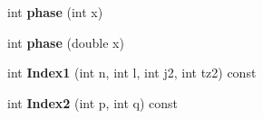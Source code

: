 \begin{DoxyCompactItemize}
\item 
\hypertarget{classModelSpace_a6b4d1686088e3fef492df10bbd806fe2}{int {\bfseries phase} (int x)}\label{classModelSpace_a6b4d1686088e3fef492df10bbd806fe2}

\item 
\hypertarget{classModelSpace_a07d1c8f00131cc6c192d440e6be329f3}{int {\bfseries phase} (double x)}\label{classModelSpace_a07d1c8f00131cc6c192d440e6be329f3}

\item 
\hypertarget{classModelSpace_ab9e4a36b032abc3fcd81da8b2a8707d2}{int {\bfseries Index1} (int n, int l, int j2, int tz2) const }\label{classModelSpace_ab9e4a36b032abc3fcd81da8b2a8707d2}

\item 
\hypertarget{classModelSpace_acb31fdcb54a8fe3168378969176f0157}{int {\bfseries Index2} (int p, int q) const }\label{classModelSpace_acb31fdcb54a8fe3168378969176f0157}

\end{DoxyCompactItemize}
